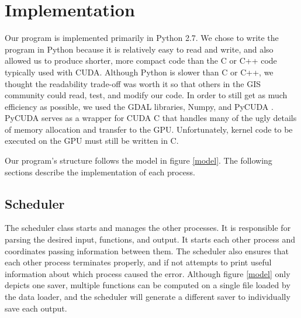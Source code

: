 \documentclass[journal]{IEEEtran}
\begin{document}
\section{Implementation} \label{implementation}
    Our program is implemented primarily in Python 2.7. We chose to write the
    program in Python because it is relatively easy to read and write, and also
    allowed us to produce shorter, more compact code than the C or C++ code
    typically used with CUDA.  Although Python is slower than C or C++, we
    thought the readability trade-off was worth it so that others in the GIS
    community could read, test, and modify our code. In order to still get as
    much efficiency as possible, we used the GDAL libraries, Numpy, and PyCUDA
    \cite{pycuda_1} \cite{pycuda_2}. PyCUDA serves as a wrapper for CUDA C that
    handles many of the ugly details of memory allocation and transfer to the
    GPU. Unfortunately, kernel code to be executed on the GPU must still be
    written in C. 
    
    Our program's structure follows the model in figure \ref{model}. The
    following sections describe the implementation of each process.

    \subsection{Scheduler}
    The scheduler class starts and manages the other processes. It is
    responsible for parsing the desired input, functions, and output. It starts
    each other process and coordinates passing information between them. The
    scheduler also ensures that each other process terminates properly, and if
    not attempts to print useful information about which process caused the
    error. Although figure \ref{model} only depicts one saver, multiple
    functions can be computed on a single file loaded by the data loader, and
    the scheduler will generate a different saver to individually save each
    output.
    
\end{document}
